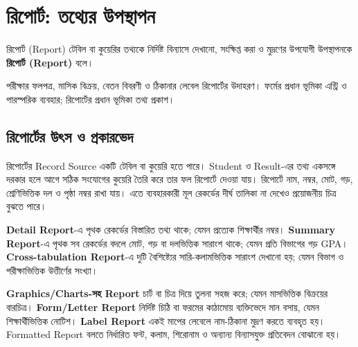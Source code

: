 \section{রিপোর্ট: তথ্যের উপস্থাপন}
\begin{definitionbox}{রিপোর্ট (Report)}
টেবিল বা কুয়েরির তথ্যকে নির্দিষ্ট বিন্যাসে দেখানো, সংক্ষিপ্ত করা ও মুদ্রণের উপযোগী উপস্থাপনকে \textbf{রিপোর্ট (Report)} বলে।
\end{definitionbox}
পরীক্ষার ফলপত্র, মাসিক বিক্রয়, বেতন বিবরণী ও ঠিকানার লেবেল রিপোর্টের উদাহরণ। ফর্মের প্রধান ভূমিকা এন্ট্রি ও পারস্পরিক ব্যবহার; রিপোর্টের প্রধান ভূমিকা তথ্য প্রকাশ।

\subsection{রিপোর্টের উৎস ও প্রকারভেদ}
রিপোর্টের Record Source একটি টেবিল বা কুয়েরি হতে পারে। Student ও Result-এর তথ্য একসঙ্গে দরকার হলে আগে সঠিক সংযোগের কুয়েরি তৈরি করে তার ফল রিপোর্টে দেওয়া যায়। রিপোর্টে নাম, নম্বর, মোট, গড়, শ্রেণিভিত্তিক দল ও পৃষ্ঠা নম্বর রাখা যায়। এতে ব্যবহারকারী মূল রেকর্ডের দীর্ঘ তালিকা না দেখেও প্রয়োজনীয় চিত্র বুঝতে পারে।

\textbf{Detail Report}-এ পৃথক রেকর্ডের বিস্তারিত তথ্য থাকে; যেমন প্রত্যেক শিক্ষার্থীর নম্বর। \textbf{Summary Report}-এ পৃথক সব রেকর্ডের বদলে মোট, গড় বা দলভিত্তিক সারাংশ থাকে; যেমন প্রতি বিভাগের গড় GPA। \textbf{Cross-tabulation Report}-এ দুটি বৈশিষ্ট্যের সারি-কলামভিত্তিক সারাংশ দেখানো হয়; যেমন বিভাগ ও পরীক্ষাভিত্তিক উত্তীর্ণের সংখ্যা।

\textbf{Graphics/Charts-সহ Report} চার্ট বা চিত্র দিয়ে তুলনা সহজ করে; যেমন মাসভিত্তিক বিক্রয়ের বারচিত্র। \textbf{Form/Letter Report} নির্দিষ্ট চিঠি বা ফরমের কাঠামোয় ব্যক্তিভেদে মান বসায়, যেমন শিক্ষার্থীভিত্তিক নোটিশ। \textbf{Label Report} একই মাপের লেবেলে নাম-ঠিকানা মুদ্রণ করতে ব্যবহৃত হয়। Formatted Report বলতে নির্ধারিত ফন্ট, কলাম, শিরোনাম ও অন্যান্য বিন্যাসযুক্ত প্রতিবেদন বোঝানো হয়।

